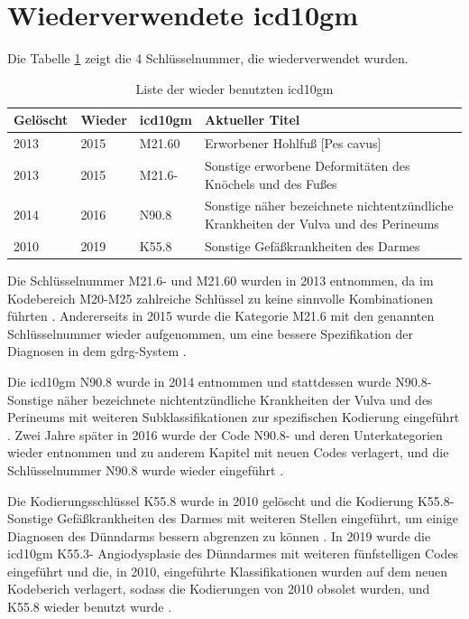 \section{Wiederverwendete \acs{icd10gm}} \label{sec:delinicd}

Die Tabelle \ref{tab:wieder} zeigt die \textsf{4} Schlüsselnummer, die wiederverwendet wurden.

\begin{table}[ht]
	\centering
	\small
	\caption[Wieder benutzte \acs{icd10gm}]{Liste der wieder benutzten \ac{icd10gm}}
	\label{tab:wieder}
	\begin{tabular}{|l|l|l|p{6cm}|}
		\hline
		\rowcolor{lightgray} Gelöscht & Wieder & \ac{icd10gm} & Aktueller Titel \\ \hline
		2013 & 2015 & M21.60 & Erworbener Hohlfuß [Pes cavus] \\ \hline
		2013 & 2015 & M21.6- & Sonstige erworbene Deformitäten des Knöchels und des Fußes \\ \hline
		2014 & 2016 & N90.8 & Sonstige näher bezeichnete nichtentzündliche Krankheiten der Vulva und des Perineums \\ \hline
		2010 & 2019 & K55.8 & Sonstige Gefäßkrankheiten des Darmes \\ \hline

\end{tabular}
\end{table}

Die Schlüsselnummer \textsf{M21.6-} und \textsf{M21.60} wurden in 2013 entnommen, da im Kodebereich \textsf{M20-M25} zahlreiche Schlüssel zu keine sinnvolle Kombinationen führten \cite{dele13}. Andererseits in 2015 wurde die Kategorie \textsf{M21.6} mit den genannten Schlüsselnummer wieder aufgenommen, um eine bessere Spezifikation der Diagnosen in dem \ac{gdrg}-System \cite{komm15}. 

Die \ac{icd10gm} \textsf{N90.8} wurde in 2014 entnommen und stattdessen wurde \textsf{N90.8-} \textsf{Sonstige näher bezeichnete nichtentzündliche Krankheiten der Vulva und des Perineums} mit weiteren Subklassifikationen zur spezifischen Kodierung eingeführt \cite{komm14}. Zwei Jahre später in 2016 wurde der Code \textsf{N90.8-} und deren Unterkategorien wieder entnommen und zu anderem Kapitel mit neuen Codes verlagert, und die Schlüsselnummer \textsf{N90.8} wurde wieder eingeführt \cite{komm16}.

Die Kodierungsschlüssel \textsf{K55.8} wurde in 2010 gelöscht und die Kodierung \textsf{K55.8-} \textsf{Sonstige Gefäßkrankheiten des Darmes} mit weiteren Stellen eingeführt, um einige Diagnosen des Dünndarms bessern abgrenzen zu können \cite{komm10}. In 2019 wurde die \ac{icd10gm} \textsf{K55.3-}   \textsf{Angiodysplasie des Dünndarmes} mit weiteren fünfstelligen Codes eingeführt und die, in 2010, eingeführte Klassifikationen wurden auf dem neuen Kodeberich verlagert, sodass die Kodierungen von 2010 obsolet wurden, und \textsf{K55.8} wieder benutzt wurde \cite{komm19}.

